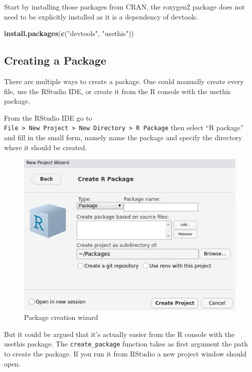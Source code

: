 \documentclass[
]{krantz}
\makeatletter
\newenvironment{Shaded}{\begin{snugshade}}{\end{snugshade}}
\newcommand{\KeywordTok}[1]{\textcolor[rgb]{0.27,0.27,0.27}{\textbf{#1}}}
\newcommand{\NormalTok}[1]{#1}
\newcommand{\StringTok}[1]{\textcolor[rgb]{0.5,0.5,0.5}{#1}}
\newenvironment{kframe}{%
\medskip{}
\setlength{\fboxsep}{.8em}
 \def\at@end@of@kframe{}%
 \ifinner\ifhmode%
  \def\at@end@of@kframe{\end{minipage}}%
  \begin{minipage}{\columnwidth}%
 \fi\fi%
 \def\FrameCommand##1{\hskip\@totalleftmargin \hskip-\fboxsep
 \colorbox{shadecolor}{##1}\hskip-\fboxsep
     \hskip-\linewidth \hskip-\@totalleftmargin \hskip\columnwidth}%
 \MakeFramed {\advance\hsize-\width
   \@totalleftmargin\z@ \linewidth\hsize
   \@setminipage}}%
 {\par\unskip\endMakeFramed%
 \at@end@of@kframe}
\renewenvironment{Shaded}{\begin{kframe}}{\end{kframe}}
\makeatother
\begin{document}
Start by installing those packages from CRAN, the roxygen2 package does not need to be explicitly installed as it is a dependency of devtools.

\begin{Shaded}
\begin{Highlighting}[]
\KeywordTok{install.packages}\NormalTok{(}\KeywordTok{c}\NormalTok{(}\StringTok{"devtools"}\NormalTok{, }\StringTok{"usethis"}\NormalTok{))}
\end{Highlighting}
\end{Shaded}

\hypertarget{basics-create-pkg}{%
\subsection{Creating a Package}\label{basics-create-pkg}}

There are multiple ways to create a package. One could manually create every file, use the RStudio IDE, or create it from the R console with the usethis \citep{R-usethis} package.

From the RStudio IDE go to \texttt{File\ \textgreater{}\ New\ Project\ \textgreater{}\ New\ Directory\ \textgreater{}\ R\ Package} then select ``R package'' and fill in the small form, namely name the package and specify the directory where it should be created.

\begin{figure}
\centering
\includegraphics{images/rstudio-create-package.png}
\caption{Package creation wizard}
\end{figure}

But it could be argued that it's actually easier from the R console with the usethis package. The \texttt{create\_package} function takes as first argument the path to create the package. If you run it from RStudio a new project window should open.
\end{document}
